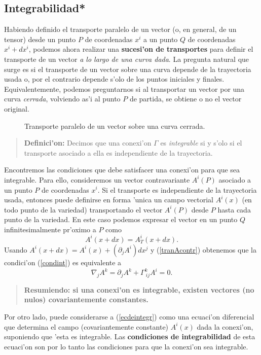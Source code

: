 \subsection{Integrabilidad*}\label{sec:integ}
Habiendo definido el transporte paralelo de un vector (o, en
general, de un tensor) desde un punto $P$
de coordenadas $x^i $ a un punto $Q$ de coordenadas $x^i +dx^i$, podemos
ahora realizar una \textbf{sucesi'on de transportes} para definir el transporte de un vector \textit{a lo largo de una curva dada}. La pregunta natural que surge es si el transporte de un vector sobre una curva depende de la trayectoria usada o, por el contrario depende s'olo de los puntos iniciales y finales. Equivalentemente, podemos preguntarnos si al transportar un vector por una curva \textit{cerrada}, volviendo as'i al punto $P$ de partida, se obtiene o no el vector original.
\begin{center}
\begin{figure}[H]
\centerline{}
\caption{Transporte paralelo de un vector sobre una curva cerrada.}
\label{dibujo}
\end{figure}
\end{center}
\begin{quotation}
\textbf{Definici'on:} Decimos que una conexi'on $\Gamma$ es \textit{integrable} si y s'olo si el transporte asociado a ella es independiente de la trayectoria.
\end{quotation}
Encontremos las condiciones que debe satisfacer una conexi'on para que sea
integrable.
Para ello, consideremos un vector contravariante $A^i(P)$ asociado a un punto
$P$ de coordenadas $x^i$. Si el transporte es independiente de la trayectoria
usada, entonces puede definirse en forma 'unica un campo vectorial $A^i(x)$ (en todo punto de la variedad) transportando el vector $A^i(P)$ desde $P$ hasta cada punto de la variedad. En este caso podemos expresar el vector en un punto $Q$ infinitesimalmente
pr'oximo a $P$ como
\begin{equation}
A^i(x+dx)=A^i_T(x+dx) . \label{condint}
\end{equation}
Usando $A^i(x+dx)=A^i(x)+(\partial_j A^i)dx^j $ y (\ref{tranAcontr}) obtenemos que
la condici'on (\ref{condint}) es equivalente a
\begin{equation}
\nabla_j A^k=\partial_j A^k+\Gamma_{\ ij}^k A^i =0.
\label{ecdeintegr}%
\end{equation}
\begin{quotation}
\textbf{Resumiendo: si una conexi'on es integrable, existen vectores (no nulos) covariantemente constantes.}
\end{quotation}
Por otro lado, puede considerarse a (\ref{ecdeintegr}) como una ecuaci'on
diferencial que determina el campo (covariantemente constante) $A^i(x)$ dada la conexi'on, suponiendo que 'esta es integrable. Las \textbf{condiciones de
integrabilidad} de esta ecuaci'on son por lo tanto las condiciones para que la
conexi'on sea integrable.



